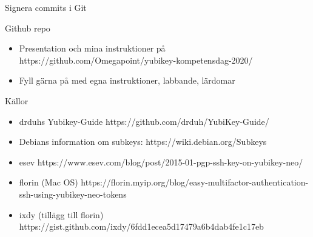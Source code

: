 \documentclass{beamer}
\begin{document}
\begin{frame}[fragile]{Signera commits i Git}
\end{frame}

\begin{frame}{Github repo}
  \begin{itemize}
    \item Presentation och mina instruktioner på\\
      https://github.com/Omegapoint/yubikey-kompetensdag-2020/
    \item Fyll gärna på med egna instruktioner, labbande, lärdomar
  \end{itemize}
\end{frame}

\begin{frame}{Källor}
  \begin{itemize}
    \item drduhs Yubikey-Guide https://github.com/drduh/YubiKey-Guide/
    \item Debians information om subkeys: https://wiki.debian.org/Subkeys
    \item esev https://www.esev.com/blog/post/2015-01-pgp-ssh-key-on-yubikey-neo/
    \item florin (Mac OS) https://florin.myip.org/blog/easy-multifactor-authentication-ssh-using-yubikey-neo-tokens
    \item ixdy (tillägg till florin) https://gist.github.com/ixdy/6fdd1ecea5d17479a6b4dab4fe1c17eb
  \end{itemize}
\end{frame}

\end{document}
